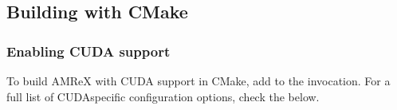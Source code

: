 \documentclass[letterpaper,10pt,english]{sphinxmanual}
\begin{document}
\subsection{Building with CMake}
\label{\detokenize{GPU:building-with-cmake}}

\subsubsection{Enabling CUDA support}
\label{\detokenize{GPU:enabling-cuda-support}}
\sphinxAtStartPar
To build AMReX with CUDA support in CMake, add  to the
 invocation. For a full list of CUDA\sphinxhyphen{}specific configuration options,
check the {\hyperref[\detokenize{GPU:tab-cmakecudavar}]{}} below.
\end{document}
